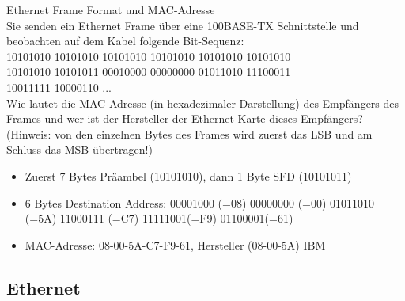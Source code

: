 \begin{example2}{Ethernet Frame Format und MAC-Adresse}\\
    Sie senden ein Ethernet Frame über eine 100BASE-TX Schnittstelle und beobachten auf dem Kabel folgende Bit-Sequenz:\\
    10101010 10101010 10101010 10101010 10101010 10101010\\
    10101010 10101011 00010000 00000000 01011010 11100011\\
    10011111 10000110 ...\\
    Wie lautet die MAC-Adresse (in hexadezimaler Darstellung) des Empfängers des Frames und
    wer ist der Hersteller der Ethernet-Karte dieses Empfängers?
    (Hinweis: von den einzelnen Bytes des Frames wird zuerst das LSB und am Schluss das
    MSB übertragen!)
    \begin{itemize}
        \item Zuerst 7 Bytes Präambel (10101010), dann 1 Byte SFD (10101011)
        \item 6 Bytes Destination Address: 00001000 (=08) 00000000 (=00) 01011010 (=5A) 11000111 (=C7) 11111001(=F9) 01100001(=61)
        \item MAC-Adresse: 08-00-5A-C7-F9-61, Hersteller (08-00-5A) IBM
    \end{itemize}
\end{example2}

\subsection*{Ethernet}

